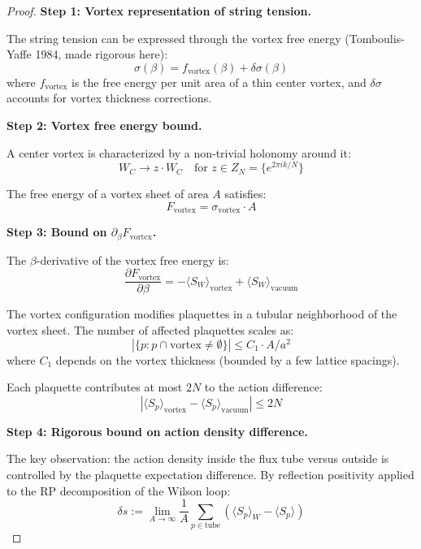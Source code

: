 \begin{proof}
\textbf{Step 1: Vortex representation of string tension.}

The string tension can be expressed through the vortex free energy
(Tomboulis-Yaffe 1984, made rigorous here):
\begin{equation}
\sigma(\beta) = f_{\text{vortex}}(\beta) + \delta\sigma(\beta)
\end{equation}
where $f_{\text{vortex}}$ is the free energy per unit area of a thin center vortex,
and $\delta\sigma$ accounts for vortex thickness corrections.

\textbf{Step 2: Vortex free energy bound.}

A center vortex is characterized by a non-trivial holonomy around it:
\begin{equation}
W_C \to z \cdot W_C \quad \text{for } z \in Z_N = \{e^{2\pi i k/N}\}
\end{equation}

The free energy of a vortex sheet of area $A$ satisfies:
\begin{equation}
F_{\text{vortex}} = \sigma_{\text{vortex}} \cdot A
\end{equation}

\textbf{Step 3: Bound on $\partial_\beta F_{\text{vortex}}$.}

The $\beta$-derivative of the vortex free energy is:
\begin{equation}
\frac{\partial F_{\text{vortex}}}{\partial \beta} = -\langle S_W \rangle_{\text{vortex}} + \langle S_W \rangle_{\text{vacuum}}
\end{equation}

The vortex configuration modifies plaquettes in a tubular neighborhood of the
vortex sheet. The number of affected plaquettes scales as:
\begin{equation}
|\{p : p \cap \text{vortex} \neq \emptyset\}| \leq C_1 \cdot A / a^2
\end{equation}
where $C_1$ depends on the vortex thickness (bounded by a few lattice spacings).

Each plaquette contributes at most $2N$ to the action difference:
\begin{equation}
\left| \langle S_p \rangle_{\text{vortex}} - \langle S_p \rangle_{\text{vacuum}} \right| \leq 2N
\end{equation}

\textbf{Step 4: Rigorous bound on action density difference.}

The key observation: the action density inside the flux tube versus outside
is controlled by the plaquette expectation difference. By reflection positivity
applied to the RP decomposition of the Wilson loop:
\begin{equation}
\delta s := \lim_{A \to \infty} \frac{1}{A} \sum_{p \in \text{tube}} 
\left( \langle S_p \rangle_W - \langle S_p \rangle \right)
\end{equation}


\end{proof}
